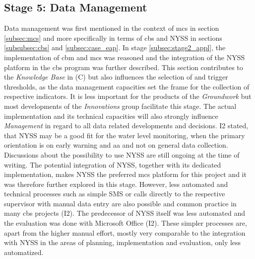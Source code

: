 
\subsection{Stage 5: Data Management}\label{subsec:stage5_appl}

Data management was first mentioned in the context of \acrlong{mcs} in section \ref*{subsec:mcs} and more specifically in terms of \acrlong{cbs} and NYSS in sections \ref*{subsubsec:cbs} and \ref*{subsec:case_eap}. In stage \ref*{subsec:stage2_appl}, the implementation of \acrshort{cbm} and \acrshort{mcs} was reasoned and the integration of the NYSS platform in the \acrshort{cbs} program was further described.\newline
This section contributes to the \textit{Knowledge Base} in (C) but also influences the selection of  and trigger thresholds, as the data management capacities set the frame for the collection of respective indicators. It is less important for the products of the \textit{Groundwork} but most developments of the \textit{Innovations} group facilitate this stage. The actual implementation and its technical capacities will also strongly influence \textit{Management} in regard to all data related developments and decisions.\newline
I2 stated, that NYSS may be a good fit for the water level monitoring, when the primary orientation is on early warning and \acrlong{aa} and not on general data collection. Discussions about the possibility to use NYSS are still ongoing at the time of writing. The potential integration of NYSS, together with its dedicated implementation, makes NYSS the preferred \acrshort{mcs} platform for this project and it was therefore further explored in this stage. However, less automated and technical processes such as simple SMS or calls directly to the respective supervisor with manual data entry are also possible and common practice in many cbs projects (I2). The predecessor of NYSS itself was less automated and the evaluation was done with Microsoft Office (I2). These simpler processes are, apart from the higher manual effort, mostly very comparable to the integration with NYSS in the areas of planning, implementation and evaluation, only less automatized.\newline
